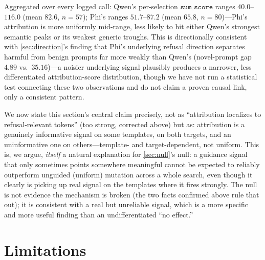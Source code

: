 \documentclass[11pt,letterpaper]{article}
\begin{document}
Aggregated over every logged call: Qwen's per-selection $\mathtt{sum\_score}$ ranges
$\mathbf{40.0}$--$\mathbf{116.0}$ (mean $82.6$, $n=57$); Phi's ranges $\mathbf{51.7}$--$\mathbf{87.2}$
(mean $65.8$, $n=80$)---Phi's attribution is more uniformly mid-range, less likely to hit either
Qwen's strongest semantic peaks or its weakest generic troughs. This is directionally consistent
with \cref{sec:direction}'s finding that Phi's underlying refusal direction separates harmful
from benign prompts far more weakly than Qwen's (novel-prompt gap $4.89$ vs.\ $35.16$)---a
noisier underlying signal plausibly produces a narrower, less differentiated attribution-score
distribution, though we have not run a statistical test connecting these two observations and do
not claim a proven causal link, only a consistent pattern.

We now state this section's central claim precisely, not as ``attribution localizes to
refusal-relevant tokens'' (too strong, corrected above) but as: attribution is a genuinely
informative signal on some templates, on both targets, and an uninformative one on others---template-
and target-dependent, not uniform. This is, we argue, \textit{itself} a natural explanation for
\cref{sec:null}'s null: a guidance signal that only sometimes points somewhere meaningful cannot
be expected to reliably outperform unguided (uniform) mutation across a whole search, even though
it clearly is picking up real signal on the templates where it fires strongly. The null is not
evidence the mechanism is broken (the two facts confirmed above rule that out); it is consistent
with a real but unreliable signal, which is a more specific and more useful finding than an
undifferentiated ``no effect.''

\section{Limitations}
\label{sec:limitations}
\end{document}
